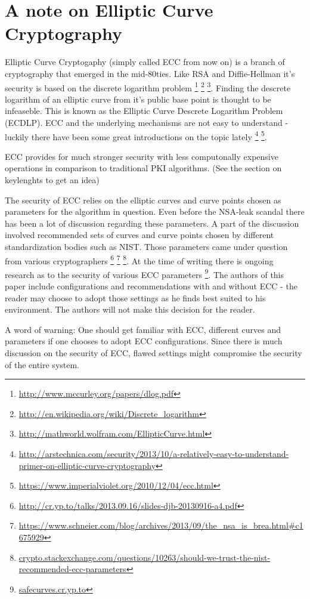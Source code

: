 \section{A note on Elliptic Curve Cryptography}

Elliptic Curve Cryptogaphy (simply called ECC from now on) is a branch of 
cryptography that emerged in the mid-80ties. Like RSA and Diffie-Hellman 
it's security is based on the discrete logarithm problem
\footnote{\url{http://www.mccurley.org/papers/dlog.pdf}} 
\footnote{\url{http://en.wikipedia.org/wiki/Discrete\_logarithm}}
\footnote{\url{http://mathworld.wolfram.com/EllipticCurve.html}}.
Finding the descrete logarithm of an elliptic curve from it's public base
point is thought to be infeaseble. This is known as the Elliptic Curve Descrete 
Logarithm Problem (ECDLP). ECC and the underlying mechanisms are not easy 
to understand - luckily there have been some great introductions on the topic lately
\footnote{\url{http://arstechnica.com/security/2013/10/a-relatively-easy-to-understand-primer-on-elliptic-curve-cryptography}}
\footnote{\url{https://www.imperialviolet.org/2010/12/04/ecc.html}}.

ECC provides for much stronger security with less computonally expensive
operations in comparison to traditional PKI algorithms. (See the section 
on keylenghts to get an idea)

The security of ECC relies on the elliptic curves and curve points chosen
as parameters for the algorithm in question. Even before the NSA-leak scandal
there has been a lot of discussion regarding these parameters. A part of the
discussion involved recommended sets of curves and curve points chosen by
different standardization bodies such as NIST. Those parameters came under
question from various cryptographers
\footnote{\url{http://cr.yp.to/talks/2013.09.16/slides-djb-20130916-a4.pdf}}
\footnote{\url{https://www.schneier.com/blog/archives/2013/09/the\_nsa\_is\_brea.html\#c1675929}}
\footnote{\url{crypto.stackexchange.com/questions/10263/should-we-trust-the-nist-recommended-ecc-parameters}}.
At the time of writing there is ongoing research as to the security of 
various ECC parameters
\footnote{\url{safecurves.cr.yp.to}}.
The authors of this paper include configurations and recommendations
with and without ECC - the reader may choose to adopt those settings
as he finds best suited to his environment. The authors will not make
this decision for the reader.

A word of warning: One should get familiar with ECC, different curves and
parameters if one chooses to adopt ECC configurations. Since there is much 
discussion on the security of ECC, flawed settings might compromise the 
security of the entire system. %


